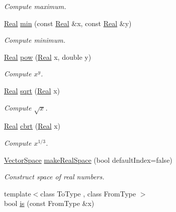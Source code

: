 \begin{DoxyCompactItemize}
\begin{DoxyCompactList}\small\item\em Compute maximum. \end{DoxyCompactList}\item 
\hypertarget{namespaceSpacy_ab0a9ae2652cc3a2701e33c6291c4c34a}{}\hyperlink{classSpacy_1_1Real}{Real} \hyperlink{namespaceSpacy_ab0a9ae2652cc3a2701e33c6291c4c34a}{min} (const \hyperlink{classSpacy_1_1Real}{Real} \&x, const \hyperlink{classSpacy_1_1Real}{Real} \&y)\label{namespaceSpacy_ab0a9ae2652cc3a2701e33c6291c4c34a}

\begin{DoxyCompactList}\small\item\em Compute minimum. \end{DoxyCompactList}\item 
\hypertarget{namespaceSpacy_acffef7eb409609abe7ad87aaad28503f}{}\hyperlink{classSpacy_1_1Real}{Real} \hyperlink{namespaceSpacy_acffef7eb409609abe7ad87aaad28503f}{pow} (\hyperlink{classSpacy_1_1Real}{Real} x, double y)\label{namespaceSpacy_acffef7eb409609abe7ad87aaad28503f}

\begin{DoxyCompactList}\small\item\em Compute $x^y$. \end{DoxyCompactList}\item 
\hypertarget{namespaceSpacy_aa779bb3e2bf547cd0ed9ef47b3d711a3}{}\hyperlink{classSpacy_1_1Real}{Real} \hyperlink{namespaceSpacy_aa779bb3e2bf547cd0ed9ef47b3d711a3}{sqrt} (\hyperlink{classSpacy_1_1Real}{Real} x)\label{namespaceSpacy_aa779bb3e2bf547cd0ed9ef47b3d711a3}

\begin{DoxyCompactList}\small\item\em Compute $\sqrt{x}$. \end{DoxyCompactList}\item 
\hypertarget{namespaceSpacy_a64093cc47f73b71ba92bc0dd37e9572b}{}\hyperlink{classSpacy_1_1Real}{Real} \hyperlink{namespaceSpacy_a64093cc47f73b71ba92bc0dd37e9572b}{cbrt} (\hyperlink{classSpacy_1_1Real}{Real} x)\label{namespaceSpacy_a64093cc47f73b71ba92bc0dd37e9572b}

\begin{DoxyCompactList}\small\item\em Compute $ x^{1/3} $. \end{DoxyCompactList}\item 
\hyperlink{classSpacy_1_1VectorSpace}{Vector\+Space} \hyperlink{namespaceSpacy_a4f4b05902653c5fc8d6411142dcb352f}{make\+Real\+Space} (bool default\+Index=false)
\begin{DoxyCompactList}\small\item\em Construct space of real numbers. \end{DoxyCompactList}\item 
\hypertarget{namespaceSpacy_ae44bfd08fa77272bab4149665b26233a}{}{\footnotesize template$<$class To\+Type , class From\+Type $>$ }\\bool \hyperlink{namespaceSpacy_ae44bfd08fa77272bab4149665b26233a}{is} (const From\+Type \&x)\label{namespaceSpacy_ae44bfd08fa77272bab4149665b26233a}


\end{DoxyCompactItemize}
